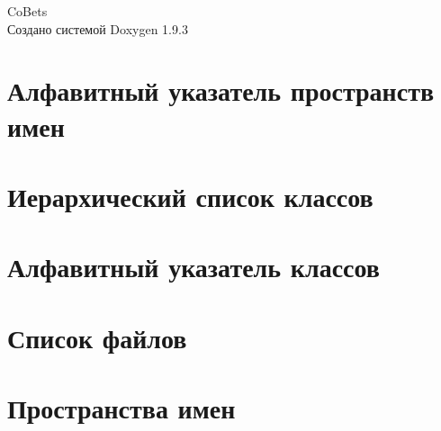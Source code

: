 \documentclass[twoside]{book}
\newcommand{\+}{\discretionary{\mbox{\scriptsize$\hookleftarrow$}}{}{}}
\newcommand{\clearemptydoublepage}{%
    \newpage{\pagestyle{empty}\cleardoublepage}%
  }
\begin{document}
  \raggedbottom
    \hypersetup{pageanchor=false,
                bookmarksnumbered=true,
                pdfencoding=unicode
               }
  \begin{titlepage}
  \vspace*{7cm}
  \begin{center}%
  {\Large Co\+Bets}\\
  \vspace*{1cm}
  {\large Создано системой Doxygen 1.9.3}\\
  \end{center}
  \end{titlepage}
  \clearemptydoublepage
  \tableofcontents
  \clearemptydoublepage
  \hypersetup{pageanchor=true}
\chapter{Алфавитный указатель пространств имен}

\chapter{Иерархический список классов}

\chapter{Алфавитный указатель классов}

\chapter{Список файлов}

\chapter{Пространства имен}














\end{document}
